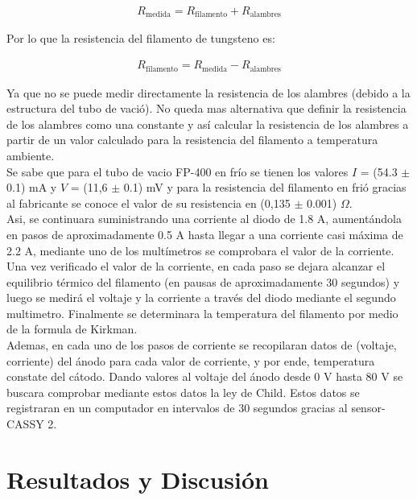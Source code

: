 \documentclass[%
 reprint,
 amsmath,amssymb,
 aps,
]{revtex4-2}
\begin{document}
\begin{align*}
    R_{\text{medida}} = R_{\text{filamento}} + R_{\text{alambres}}
\end{align*}

Por lo que la resistencia del filamento de tungsteno es:

\begin{align*}
    R_{\text{filamento}} = R_{\text{medida}} - R_{\text{alambres}}
\end{align*}

\vspace{0.2 cm}
Ya que no se puede medir directamente la resistencia de los alambres (debido a la estructura del tubo de vació). No queda mas alternativa que definir la resistencia de los alambres como una constante  y así calcular la resistencia de los alambres a partir de un valor calculado para la resistencia del filamento a temperatura ambiente.
\\

Se sabe que para el tubo de vacio FP-400 en frío se tienen los valores $I$ = (54.3 $\pm$ 0.1) mA y $V$ = (11,6 $\pm$ 0.1) mV y para la resistencia del filamento en frió gracias al fabricante se conoce el valor de su resistencia en (0,135 $\pm$ 0.001) $\Omega$.
\\

Asi, se continuara suministrando una corriente al diodo de 1.8 A, aumentándola en pasos de aproximadamente 0.5 A hasta llegar a una corriente casi máxima de 2.2 A, mediante uno de los multímetros se comprobara el valor de la corriente.
\\

Una vez verificado el valor de la corriente, en cada paso se dejara alcanzar el equilibrio térmico del filamento (en pausas de aproximadamente 30 segundos) y luego se medirá el voltaje y la corriente a través del diodo mediante el segundo multimetro. Finalmente se determinara la temperatura del filamento por medio de la formula de Kirkman.
\\

Ademas, en cada uno de los pasos de corriente se recopilaran datos de (voltaje, corriente) del ánodo para cada valor de corriente, y por ende, temperatura constate del cátodo. Dando valores al voltaje del ánodo desde 0 V hasta 80 V se buscara comprobar mediante estos datos la ley de Child. Estos datos se registraran en un computador en intervalos de 30 segundos gracias al sensor-CASSY 2.

\section{Resultados y Discusión}
\end{document}
